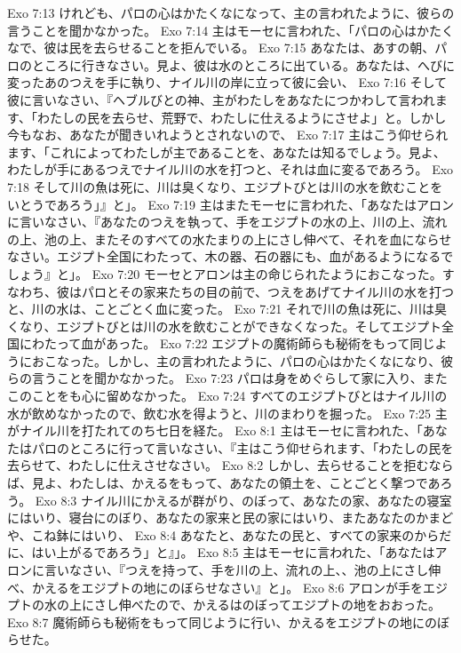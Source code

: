 Exo 7:13  けれども、パロの心はかたくなになって、主の言われたように、彼らの言うことを聞かなかった。
Exo 7:14  主はモーセに言われた、「パロの心はかたくなで、彼は民を去らせることを拒んでいる。
Exo 7:15  あなたは、あすの朝、パロのところに行きなさい。見よ、彼は水のところに出ている。あなたは、へびに変ったあのつえを手に執り、ナイル川の岸に立って彼に会い、
Exo 7:16  そして彼に言いなさい、『ヘブルびとの神、主がわたしをあなたにつかわして言われます、「わたしの民を去らせ、荒野で、わたしに仕えるようにさせよ」と。しかし今もなお、あなたが聞きいれようとされないので、
Exo 7:17  主はこう仰せられます、「これによってわたしが主であることを、あなたは知るでしょう。見よ、わたしが手にあるつえでナイル川の水を打つと、それは血に変るであろう。
Exo 7:18  そして川の魚は死に、川は臭くなり、エジプトびとは川の水を飲むことをいとうであろう」』と」。
Exo 7:19  主はまたモーセに言われた、「あなたはアロンに言いなさい、『あなたのつえを執って、手をエジプトの水の上、川の上、流れの上、池の上、またそのすべての水たまりの上にさし伸べて、それを血にならせなさい。エジプト全国にわたって、木の器、石の器にも、血があるようになるでしょう』と」。
Exo 7:20  モーセとアロンは主の命じられたようにおこなった。すなわち、彼はパロとその家来たちの目の前で、つえをあげてナイル川の水を打つと、川の水は、ことごとく血に変った。
Exo 7:21  それで川の魚は死に、川は臭くなり、エジプトびとは川の水を飲むことができなくなった。そしてエジプト全国にわたって血があった。
Exo 7:22  エジプトの魔術師らも秘術をもって同じようにおこなった。しかし、主の言われたように、パロの心はかたくなになり、彼らの言うことを聞かなかった。
Exo 7:23  パロは身をめぐらして家に入り、またこのことをも心に留めなかった。
Exo 7:24  すべてのエジプトびとはナイル川の水が飲めなかったので、飲む水を得ようと、川のまわりを掘った。
Exo 7:25  主がナイル川を打たれてのち七日を経た。
Exo 8:1  主はモーセに言われた、「あなたはパロのところに行って言いなさい、『主はこう仰せられます、「わたしの民を去らせて、わたしに仕えさせなさい。
Exo 8:2  しかし、去らせることを拒むならば、見よ、わたしは、かえるをもって、あなたの領土を、ことごとく撃つであろう。
Exo 8:3  ナイル川にかえるが群がり、のぼって、あなたの家、あなたの寝室にはいり、寝台にのぼり、あなたの家来と民の家にはいり、またあなたのかまどや、こね鉢にはいり、
Exo 8:4  あなたと、あなたの民と、すべての家来のからだに、はい上がるであろう」と』」。
Exo 8:5  主はモーセに言われた、「あなたはアロンに言いなさい、『つえを持って、手を川の上、流れの上、、池の上にさし伸べ、かえるをエジプトの地にのぼらせなさい』と」。
Exo 8:6  アロンが手をエジプトの水の上にさし伸べたので、かえるはのぼってエジプトの地をおおった。
Exo 8:7  魔術師らも秘術をもって同じように行い、かえるをエジプトの地にのぼらせた。
